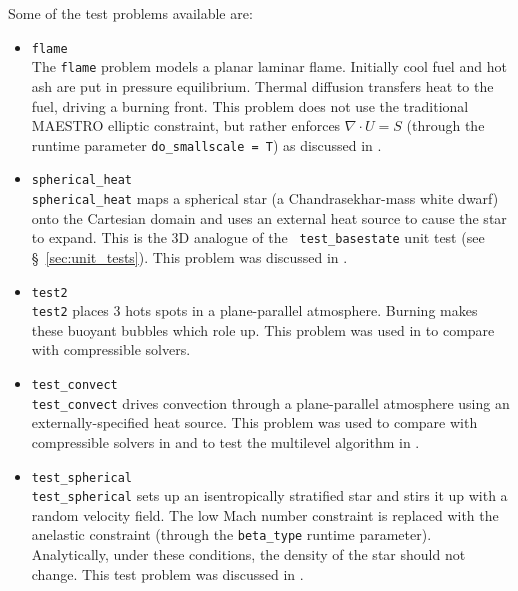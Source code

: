 Some of the test problems available are:
\begin{itemize}
\item {\tt flame} \\[-3mm]

The {\tt flame} problem models a planar laminar flame.  Initially cool
fuel and hot ash are put in pressure equilibrium.  Thermal diffusion
transfers heat to the fuel, driving a burning front.  This problem
does not use the traditional MAESTRO elliptic constraint, but
rather enforces $\nabla \cdot U = S$ (through the runtime parameter
{\tt do\_smallscale = T}) as discussed in \cite{SNe}.

\item {\tt spherical\_heat} \\[-3mm]

{\tt spherical\_heat} maps a spherical star (a Chandrasekhar-mass white
dwarf) onto the Cartesian domain and uses an external heat source to
cause the star to expand.  This is the 3D analogue of the {\tt
  test\_basestate} unit test (see \S~\ref{sec:unit_tests}).  This
problem was discussed in \cite{multilevel}.

\item {\tt test2} \\[-3mm]

{\tt test2} places 3 hots spots in a plane-parallel atmosphere.
Burning makes these buoyant bubbles which role up.  This problem was
used in \cite{lowMach3} to compare with compressible solvers.

\item {\tt test\_convect} \\[-3mm]

{\tt test\_convect} drives convection through a plane-parallel
atmosphere using an externally-specified heat source.  This problem
was used to compare with compressible solvers in \cite{lowMach3}
and to test the multilevel algorithm in \cite{multilevel}.

\item {\tt test\_spherical} \\[-3mm]

{\tt test\_spherical} sets up an isentropically stratified star
and stirs it up with a random velocity field.  The low Mach number
constraint is replaced with the anelastic constraint (through
the {\tt beta\_type} runtime parameter).  Analytically, under
these conditions, the density of the star should not change.
This test problem was discussed in \cite{lowMach4}.

\end{itemize}


